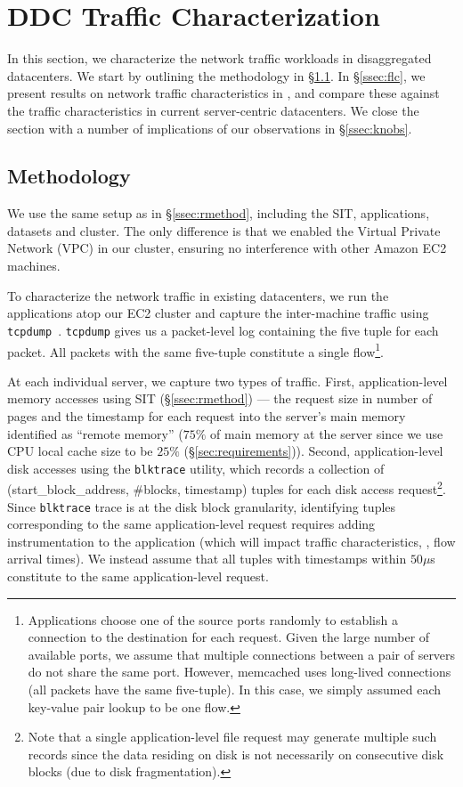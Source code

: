 \section{DDC Traffic Characterization}
\label{sec:workloads}
In this section, we characterize the network traffic workloads in disaggregated datacenters. We start by outlining the methodology in \S\ref{ssec:method1}. In \S\ref{ssec:flc}, we present results on network traffic characteristics in \dis, and compare these against the traffic characteristics in current server-centric datacenters. We close the section with a number of implications of our observations in \S\ref{ssec:knobs}.

\subsection{Methodology}
\label{ssec:method1} 
We use the same setup as in \S\ref{ssec:rmethod}, including the SIT, applications, datasets and cluster. The only difference is that we enabled the Virtual Private Network (VPC) in our cluster, ensuring no interference with other Amazon EC2 machines. 

To characterize the network traffic in existing datacenters, we run the applications atop our EC2 cluster and capture the inter-machine traffic using {\tt tcpdump}~\cite{tcpdump}. {\tt tcpdump} gives us a packet-level log containing the five tuple for each packet. All packets with the same five-tuple constitute a single flow{\footnote{Applications choose one of the source ports randomly to establish a connection to the destination for each request. Given the large number of available ports, we assume that multiple connections between a pair of servers do not share the same port. However, memcached uses long-lived connections (all packets have the same five-tuple). In this case, we simply assumed each key-value pair lookup to be one flow.}}.

At each individual server, we capture two types of traffic. First, application-level memory accesses using SIT (\S\ref{ssec:rmethod}) --- the request size in number of pages and the timestamp for each request into the server's main memory identified as ``remote memory'' ($75\%$ of main memory at the server since we use CPU local cache size to be $25\%$ (\S\ref{sec:requirements})). Second, application-level disk accesses using the {\tt blktrace} utility, which records a collection of (start\_block\_address, \#blocks, timestamp) tuples for each disk access request{\footnote{Note that a single application-level file request may generate multiple such records since the data residing on disk is not necessarily on consecutive disk blocks (due to disk fragmentation).}}. Since {\tt blktrace} trace is at the disk block granularity, identifying tuples corresponding to the same application-level request requires adding instrumentation to the application (which will impact traffic characteristics, \eg, flow arrival times). We instead assume that all tuples with timestamps within $50\mu$s constitute to the same application-level request. 


